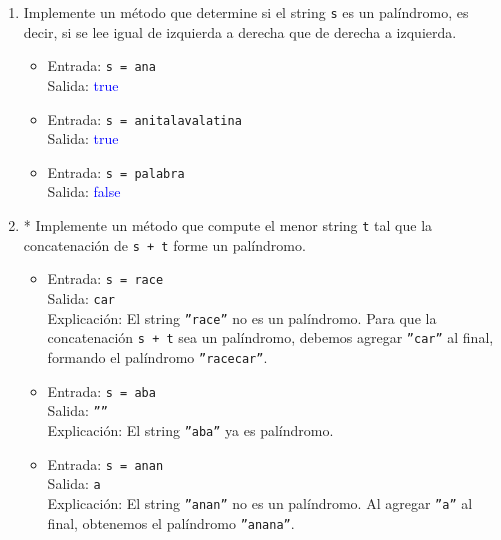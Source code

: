 \begin{enumerate}[label=\alph*)]
    \item Implemente un método que determine si el string \texttt{s} es un palíndromo, es decir, si se lee igual de izquierda a derecha que de derecha a izquierda.
    
    \begin{itemize}
        \item Entrada: \texttt{s = ana}\\
        Salida: \textcolor{blue}{true}

        \item Entrada: \texttt{s = anitalavalatina}\\
        Salida: \textcolor{blue}{true}

        \item Entrada: \texttt{s = palabra}\\
        Salida: \textcolor{blue}{false}
    \end{itemize}

    \item * Implemente un método que compute el menor string \texttt{t} tal que la concatenación de \texttt{s + t} forme un palíndromo.

    \begin{itemize}
        \item Entrada: \texttt{s = race}\\
        Salida: \texttt{car}\\
        Explicación: El string \texttt{''race''} no es un palíndromo. Para que la concatenación \texttt{s + t} sea un palíndromo, debemos agregar \texttt{''car''} al final, formando el palíndromo \texttt{''racecar''}.

        \item Entrada: \texttt{s = aba}\\
        Salida: \texttt{''''}\\
        Explicación: El string \texttt{''aba''} ya es palíndromo.

        \item Entrada: \texttt{s = anan}\\
        Salida: \texttt{a}\\
        Explicación: El string \texttt{''anan''} no es un palíndromo. Al agregar \texttt{''a''} al final, obtenemos el palíndromo \texttt{''anana''}.
    \end{itemize}
\end{enumerate}
